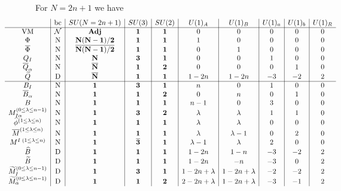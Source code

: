 \documentclass[12pt]{article}
\numberwithin{equation}{section}
\begin{document}
For $N = 2n+1$ we have
\begin{align}
\hspace*{-1.5cm}
\label{SU2n1_AS_charges}
\begin{array}{c|c|c|c|c|c|c|c|c|c}
& \textrm{bc} & SU(N = 2n+1) & SU(3) & SU(2) & U(1)_A & U(1)_B & U(1)_a & U(1)_b & U(1)_R \\ \hline
\textrm{VM} & \mathcal{N} & {\bf Adj} & {\bf 1} & {\bf 1} & 0 & 0 & 0 & 0 & 0 \\
\Phi & \textrm{N} & {\bf N(N-1)/2} & {\bf 1} & {\bf 1} & 1 & 0 & 0 & 0 & 0 \\
\overline{\Phi} & \textrm{N} & {\bf \overline{N(N-1)/2}} & {\bf 1} & {\bf 1} & 0 & 1 & 0 & 0 & 0 \\
Q_I & \textrm{N} & {\bf N} & {\bf 3} & {\bf 1} & 0 & 0 & 1 & 0 & 0 \\
\overline{Q}_{\alpha} & \textrm{N} & {\bf \overline{N}} & {\bf 1} & {\bf 2} & 0 & 0 & 0 & 1 & 0 \\
\widetilde{Q} & \textrm{D} & {\bf \overline{N}} & {\bf 1} & {\bf 1} & 1-2n & 1-2n & -3 & -2 & 2 \\ \hline
B_I & \textrm{N} & {\bf 1} & {\bf 3} & {\bf 1} & n & 0 & 1 & 0 & 0 \\
\overline{B}_{\alpha} & \textrm{N} & {\bf 1} & {\bf 1} & {\bf 2} & 0 & n & 0 & 1 & 0 \\
B & \textrm{N} & {\bf 1} & {\bf 1} & {\bf 1} & n-1 & 0 & 3 & 0 & 0 \\
M^{(0 \le \lambda \le n-1)}_{I \alpha} & \textrm{N} & {\bf 1} & {\bf 3} & {\bf 2} & \lambda & \lambda & 1 & 1 & 0 \\
\widehat{\phi}^{(1 \le \lambda \le n)} & \textrm{N} & {\bf 1} & {\bf 1} & {\bf 1} & \lambda & \lambda & 0 & 0 & 0 \\
\overline{M}^{(1 \le \lambda \le n)} & \textrm{N} & {\bf 1} & {\bf 1} & {\bf 1} & \lambda & \lambda-1 & 0 & 2 & 0 \\
M^{I \; (1 \le \lambda \le n)} & \textrm{N} & {\bf 1} & {\bf \overline{3}} & {\bf 1} & \lambda-1 & \lambda & 2 & 0 & 0 \\
\widehat{B} & \textrm{D} & {\bf 1} & {\bf 1} & {\bf 1} & 1-2n & 1-n & -3 & -2 & 2 \\
\widetilde{B} & \textrm{D} & {\bf 1} & {\bf 1} & {\bf 1} & 1-2n & -n & -3 & 0 & 2 \\
\widetilde{M}^{(0 \le \lambda \le n-1)}_I & \textrm{D} & {\bf 1} & {\bf 3} & {\bf 1} & 1-2n+\lambda & 1-2n+\lambda & -2 & -2 & 2 \\
\widetilde{M}^{(0 \le \lambda \le n-1)}_{\alpha} & \textrm{D} & {\bf 1} & {\bf 1} & {\bf 2} & 2 - 2n + \lambda & 1 - 2n + \lambda & -3 & -1 & 2
\end{array}
\end{align}
\end{document}

